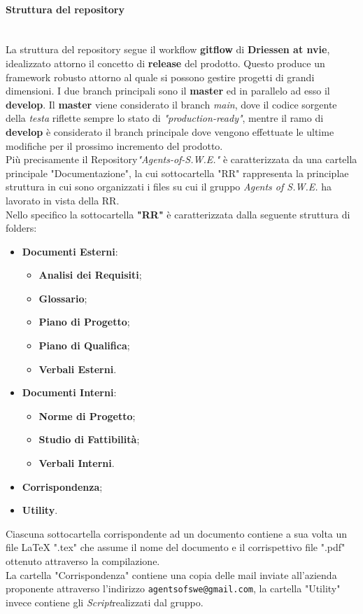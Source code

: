 \paragraph{Struttura del repository} \-\\ 
La struttura del repository segue il workflow \textbf{gitflow} di \textbf{Driessen at nvie}, idealizzato attorno il concetto di \textbf{release} del prodotto. Questo produce un framework robusto attorno al quale si possono gestire progetti di grandi dimensioni. I due branch principali sono il \textbf{master} ed in parallelo ad esso il \textbf{develop}. 
Il \textbf{master} viene considerato il branch \textit{main}, dove il codice sorgente della \textit{testa} riflette sempre lo stato di \textit{"production-ready"},
mentre il ramo di \textbf{develop} è considerato il branch principale dove vengono effettuate le ultime modifiche per il prossimo incremento del prodotto. ~\\
Più precisamente il Repository\glossario \textit{"Agents-of-S.W.E."} è caratterizzata da una cartella principale "Documentazione", la cui sottocartella "RR" rappresenta la principlae struttura in cui sono organizzati i files su cui il gruppo \textit{Agents of S.W.E.} ha lavorato in vista della RR.\\
	Nello specifico la sottocartella \textbf{"RR"} è caratterizzata dalla seguente struttura di folders:
	\begin{itemize}
	\item \textbf{Documenti Esterni}:
		\begin{itemize}
		\item \textbf{Analisi dei Requisiti};
		\item \textbf{Glossario};
		\item \textbf{Piano di Progetto};
		\item \textbf{Piano di Qualifica};
		\item \textbf{Verbali Esterni}.
		\end{itemize}
	\item \textbf{Documenti Interni}:
		\begin{itemize}
		\item \textbf{Norme di Progetto};
		\item \textbf{Studio di Fattibilità};
		\item \textbf{Verbali Interni}.
		\end{itemize}
	\item \textbf{Corrispondenza};
	\item \textbf{Utility}.
	\end{itemize}
	Ciascuna sottocartella corrispondente ad un documento contiene a sua volta un file LaTeX ".tex" che assume il nome del documento e il corrispettivo file ".pdf" ottenuto attraverso la compilazione.\\
	La cartella "Corrispondenza" contiene una copia delle mail inviate all'azienda proponente attraverso l'indirizzo \texttt{agentsofswe@gmail.com}, la cartella "Utility" invece contiene gli \textit{Script}\glossario realizzati dal gruppo.

